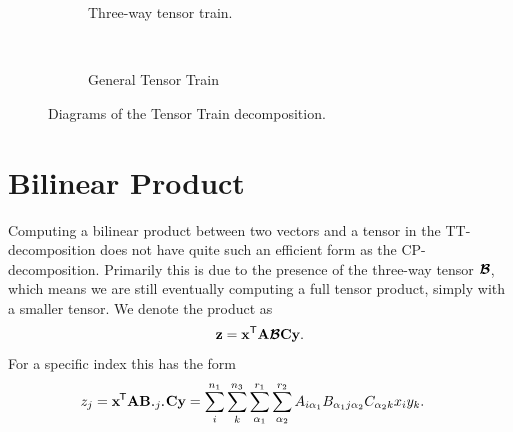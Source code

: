\begin{figure}
	\centering
	\begin{subfigure}[t]{0.45\textwidth}
		\caption{Three-way tensor train.}
	\end{subfigure}~
	\begin{subfigure}[t]{0.45\textwidth}
		\caption{General Tensor Train}
	\end{subfigure}
	\caption{Diagrams of the Tensor Train decomposition.}
	\label{fig:tttnds}
\end{figure}

\section{Bilinear Product}
Computing a bilinear product between two vectors and a tensor in the TT-decomposition does not
have quite such an efficient form as the CP-decomposition. Primarily this is due to the presence
of the three-way tensor \(\bm{\mathcal{B}}\), which means we are still eventually computing a full
tensor product, simply with a smaller tensor. We denote the product as
\begin{equation} \label{eq:tt_bilin}
	\mathbf{z} = \mathbf{x}^\mathsf{T}\mathbf{A}\bm{\mathcal{B}}\mathbf{C}\mathbf{y}.
\end{equation} For a specific index this has the form
\begin{align} \label{eq:tt_bilin_index}
	z_j &= \tran{\vec{x}}\vec{A}\mat{B}_{\midbullet j \midbullet}\mat{C}\vec{y}
		= \sum_{i}^{n_1}\sum_{k}^{n_3}
		\sum_{\alpha_1}^{r_1}
		\sum_{\alpha_2}^{r_2}A_{i\alpha_1}B_{\alpha_1j\alpha_2}C_{\alpha_2k}x_iy_k.
\end{align}

